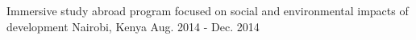 
  \cventry
    {Immersive study abroad program focused on social and environmental impacts of development} %
    {} %
    {Nairobi, Kenya} %
    {Aug. 2014 - Dec. 2014} %
    
    
    
\newenvironment{cvbib}{%
  \vspace{-4.0mm}
  \begin{justify}
  \begin{itemize}[leftmargin=2ex, nosep, noitemsep]
    \setlength{\parskip}{0pt}
    \renewcommand{\labelitemi}{\bullet}
}{%
  \end{itemize}
  \end{justify}
  \vspace{-4.0mm}
}

{
\begin{cvitems} %
    \item {}
    \item {}
\end{cvitems}
}



